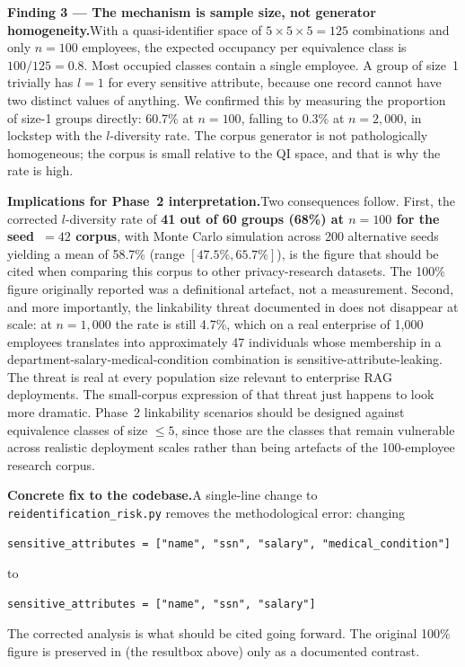 \documentclass[12pt, a4paper]{article}
\begin{document}
\medskip
\noindent\textbf{Finding 3 --- The mechanism is sample size, not generator homogeneity.}\quad With a quasi-identifier space of $5 \times 5 \times 5 = 125$ combinations and only $n = 100$ employees, the expected occupancy per equivalence class is $100 / 125 = 0.8$. Most occupied classes contain a single employee. A group of size~1 trivially has $l = 1$ for every sensitive attribute, because one record cannot have two distinct values of anything. We confirmed this by measuring the proportion of size-1 groups directly: 60.7\% at $n = 100$, falling to 0.3\% at $n = 2{,}000$, in lockstep with the $l$-diversity rate. The corpus generator is not pathologically homogeneous; the corpus is small relative to the QI space, and that is why the rate is high.

\medskip
\noindent\textbf{Implications for Phase~2 interpretation.}\quad Two consequences follow. First, the corrected $l$-diversity rate of \textbf{41 out of 60 groups (68\%) at $n = 100$ for the seed~$=42$ corpus}, with Monte Carlo simulation across 200 alternative seeds yielding a mean of 58.7\% (range $[47.5\%, 65.7\%]$), is the figure that should be cited when comparing this corpus to other privacy-research datasets. The 100\% figure originally reported was a definitional artefact, not a measurement. Second, and more importantly, the linkability threat documented in  does not disappear at scale: at $n = 1{,}000$ the rate is still 4.7\%, which on a real enterprise of 1{,}000 employees translates into approximately 47 individuals whose membership in a department-salary-medical-condition combination is sensitive-attribute-leaking. The threat is real at every population size relevant to enterprise RAG deployments. The small-corpus expression of that threat just happens to look more dramatic. Phase~2 linkability scenarios should be designed against equivalence classes of size $\leq 5$, since those are the classes that remain vulnerable across realistic deployment scales rather than being artefacts of the 100-employee research corpus.

\medskip
\noindent\textbf{Concrete fix to the codebase.}\quad A single-line change to \texttt{reidentification\_risk.py} removes the methodological error: changing
\begin{lstlisting}[style=termstyle]
sensitive_attributes = ["name", "ssn", "salary", "medical_condition"]
\end{lstlisting}
to
\begin{lstlisting}[style=termstyle]
sensitive_attributes = ["name", "ssn", "salary"]
\end{lstlisting}
The corrected analysis is what should be cited going forward. The original 100\% figure is preserved in  (the resultbox above) only as a documented contrast.
\end{document}
